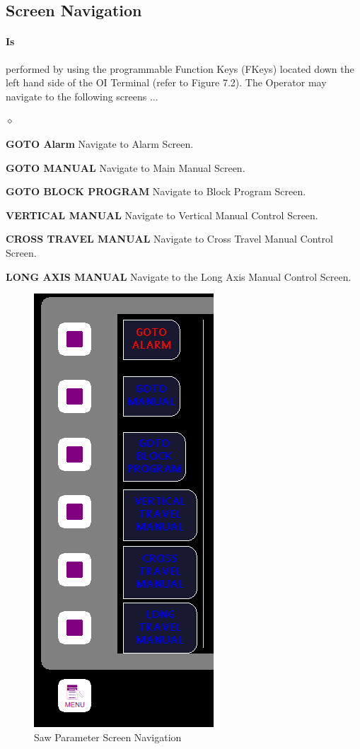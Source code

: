 \subsection{Screen Navigation}
\paragraph*{Is}performed by using the programmable Function Keys (FKeys) located down the left hand side of the OI Terminal (refer to Figure 7.2). The Operator may navigate to the following screens ...
\begin{list}{$\diamond$}{}
	\item \textbf{GOTO Alarm} Navigate to Alarm Screen.
	\item \textbf{GOTO MANUAL} Navigate to Main Manual Screen.
	\item \textbf{GOTO BLOCK PROGRAM} Navigate to Block Program Screen.
	\item \textbf{VERTICAL MANUAL} Navigate to Vertical Manual Control Screen.
	\item \textbf{CROSS TRAVEL MANUAL} Navigate to Cross Travel Manual Control Screen.
	\item \textbf{LONG AXIS MANUAL} Navigate to the Long Axis Manual Control Screen.
\end{list}
\begin{figure}
	\centering
	\includegraphics[width=0.2\linewidth]{screen-captures/program/pgm-saw-info-nav}
	\caption{Saw Parameter Screen Navigation}
	\label{fig:pgm-saw-info-screen-nav}
\end{figure}
